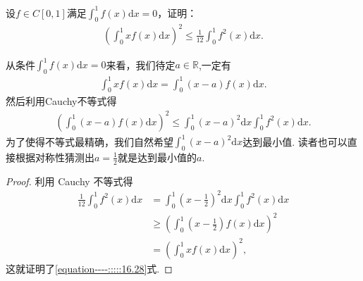 \documentclass[../../main.tex]{subfiles}
\begin{document}
\begin{example}
设\(f \in C[0,1]\)满足\(\int_{0}^{1}f(x)\mathrm{d}x = 0\)，证明：
\begin{align*}
\left(\int_{0}^{1}xf(x)\mathrm{d}x\right)^2 \leqslant \frac{1}{12}\int_{0}^{1}f^{2}(x)\mathrm{d}x. \label{equation----:::::16.28}
\end{align*}
\end{example}
\begin{note}
从条件\(\int_{0}^{1}f(x)\mathrm{d}x = 0\)来看，我们待定\(a \in \mathbb{R}\),一定有
\begin{align*}
\int_{0}^{1}xf(x)\mathrm{d}x = \int_{0}^{1}(x - a)f(x)\mathrm{d}x.
\end{align*}
然后利用Cauchy不等式得
\begin{align*}
\left(\int_{0}^{1}(x - a)f(x)\mathrm{d}x\right)^2 \leqslant \int_{0}^{1}(x - a)^2\mathrm{d}x\int_{0}^{1}f^{2}(x)\mathrm{d}x.
\end{align*}
为了使得不等式最精确，我们自然希望\(\int_{0}^{1}(x - a)^2\mathrm{d}x\)达到最小值. 读者也可以直接根据对称性猜测出\(a = \frac{1}{2}\)就是达到最小值的\(a\).
\end{note}
\begin{proof}
利用 Cauchy 不等式得
\begin{align*}
\frac{1}{12}\int_{0}^{1}f^{2}(x)\mathrm{d}x&=\int_{0}^{1}\left(x - \frac{1}{2}\right)^2\mathrm{d}x\int_{0}^{1}f^{2}(x)\mathrm{d}x\\
&\geqslant \left(\int_{0}^{1}\left(x - \frac{1}{2}\right)f(x)\mathrm{d}x\right)^2\\
&=\left(\int_{0}^{1}xf(x)\mathrm{d}x\right)^2,
\end{align*}
这就证明了\eqref{equation----:::::16.28}式.
\end{proof}
\end{document}
